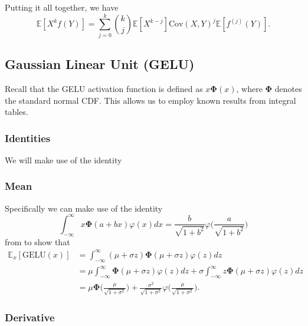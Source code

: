 \documentclass{article}
\theoremstyle{plain}
\theoremstyle{definition}
\theoremstyle{remark}
\newcommand{\Pphi}{\boldsymbol{\Phi}}
\newcommand{\E}{\mathbb{E}}
\begin{document}
Putting it all together, we have
\begin{equation}
    \E[X^k f(Y)] = \sum_{j = 0}^k \binom{k}{j} \E[X^{k - j}] \mathrm{Cov}(X, Y)^j \E[f^{(j)}(Y)].
\end{equation}

\subsection{Gaussian Linear Unit (GELU)}

Recall that the GELU activation function is defined as $x \Pphi(x)$, where $\Pphi$ denotes the standard normal CDF. This allows us to employ known results from integral tables.

\subsubsection{Identities}

We will make use of the identity

\subsubsection{Mean}

Specifically we can make use of the identity
\begin{equation}
    \int_{-\infty}^{\infty} x \Pphi(a + bx) \varphi(x) dx = \frac{b}{\sqrt{1 + b^2}} \varphi \Big (\frac{a}{\sqrt{1 + b^2}} \Big )
\end{equation}
from \citet{owen1980table} to show that
\begin{align}
    \E_x [\mathrm{GELU}(x)] &= \int_{-\infty}^{\infty} (\mu + \sigma z) \Pphi(\mu + \sigma z) \varphi(z) dz \\
    &= \mu \int_{-\infty}^{\infty} \Pphi(\mu + \sigma z) \varphi(z) dz + \sigma \int_{-\infty}^{\infty} z \Pphi(\mu + \sigma z) \varphi(z) dz \\
    &= \mu \Pphi \Big ( \frac{\mu}{\sqrt{1 + \sigma^2}} \Big ) + \frac{\sigma^2}{\sqrt{1 + \sigma^2}} \varphi \Big ( \frac{\mu}{\sqrt{1 + \sigma^2}} \Big ).
\end{align}

\subsubsection{Derivative}
\end{document}
